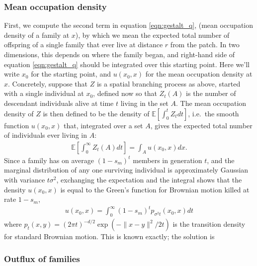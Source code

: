 \documentclass{article}
\newcommand{\E}{\mathbb{E}}
\begin{document}
\subsubsection*{Mean occupation density}

First, we compute the second term in equation \eqref{eqn:gestalt_q}, (mean occupation density of a family at $x$),
by which we mean the expected total number of offspring of a single family that ever live at distance $r$ from the patch.
In two dimensions, this depends on where the family began, 
and right-hand side of equation \eqref{eqn:gestalt_q} should be integrated over this starting point.
Here we'll write $x_0$ for the starting point, and $u(x_0,x)$ for the mean occupation density at $x$.
Concretely, suppose that $Z$ is a spatial branching process as above, started with a single individual at $x_0$,
defined now so that $Z_t(A)$ is the number of descendant individuals alive at time $t$ living in the set $A$.
The mean occupation density of $Z$ is then defined to be the density of $\E[\int_0^t Z_t dt]$,
i.e.\ the smooth function $u(x_0,x)$ that, integrated over a set $A$, 
gives the expected total number of individuals ever living in $A$:
\begin{align} \label{eqn:occupation_density_defn}
    \E\left[ \int_0^\infty Z_t(A) dt \right] = \int_A u(x_0,x) dx .
\end{align}
Since a family has on average $(1-s_m)^t$ members in generation $t$,
and the marginal distribution of any one surviving individual is approximately Gaussian with variance $t \sigma^2$,
exchanging the expectation and the integral shows that
the density $u(x_0,x)$ is equal to the Green's function for Brownian motion killed at rate $1-s_m$,
\begin{align} \label{eqn:occupation_density_solution}
    u(x_0,x) = \int_0^\infty (1-s_m)^t p_{\sigma^2 t}(x_0,x) dt
\end{align}
where $p_t(x,y) = (2 \pi t)^{-d/2} \exp(-\|x-y\|^2/2t)$ is the transition density for standard Brownian motion.
This is known exactly; the solution is 


\subsubsection*{Outflux of families}
\end{document}
